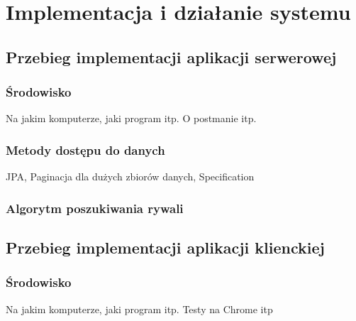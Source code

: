 \chapter{Implementacja i działanie systemu}

\section{Przebieg implementacji aplikacji serwerowej}

\subsection{Środowisko}

Na jakim komputerze, jaki program itp. O postmanie itp.

\subsection{Metody dostępu do danych}

JPA, Paginacja dla dużych zbiorów danych, Specification


\subsection{Algorytm poszukiwania rywali}

\section{Przebieg implementacji aplikacji klienckiej}

\subsection{Środowisko}

Na jakim komputerze, jaki program itp. Testy na Chrome itp
